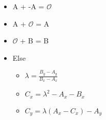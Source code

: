 \begin{itemize}
    \item[] A + -A = $\mathcal{O}$
    \item[] A + $\mathcal{O} $ = A
    \item[] $\mathcal{O}$ + B = B
    \item[] Else
    \begin{itemize}
        \item[] $\lambda = \frac{B_y - A_y} {B_x - A_x}$
        \item[] $C_x = \lambda^2 - A_x - B_x$
        \item[] $C_y = \lambda(A_x - C_x) - A_y$
    \end{itemize}
\end{itemize}

